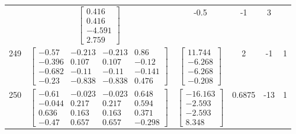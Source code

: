 \documentclass[a4paper,12pt]{article}
\begin{document}
\begin{tabular}{c c c c c c}
&
$\begin{bmatrix} 0.416 \\ 0.416 \\ -4.591 \\ 2.759 \end{bmatrix}$
&
-0.5
&
-1
&
3
\\
249
&
$\begin{bmatrix} -0.57 & -0.213 & -0.213 & 0.86 \\ -0.396 & 0.107 & 0.107 & -0.12 \\ -0.682 & -0.11 & -0.11 & -0.141 \\ -0.23 & -0.838 & -0.838 & 0.476 \end{bmatrix}$
&
$\begin{bmatrix} 11.744 \\ -6.268 \\ -6.268 \\ -0.208 \end{bmatrix}$
&
2
&
-1
&
1
\\
250
&
$\begin{bmatrix} -0.61 & -0.023 & -0.023 & 0.648 \\ -0.044 & 0.217 & 0.217 & 0.594 \\ 0.636 & 0.163 & 0.163 & 0.371 \\ -0.47 & 0.657 & 0.657 & -0.298 \end{bmatrix}$
&
$\begin{bmatrix} -16.163 \\ -2.593 \\ -2.593 \\ 8.348 \end{bmatrix}$
&
0.6875
&
-13
&
1
\\
\end{tabular} \egroup \newpage
\end{document}
